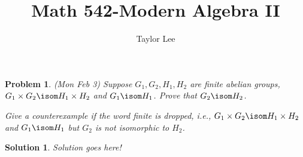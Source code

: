 \documentclass[12pt]{article}
\theoremstyle{moo}
\newtheorem*{prob}{Problem}
\newtheorem*{sol}{Solution}
\begin{document}
\fontseries {\seriesdefault}
\fontshape {\shapedefault}
\selectfont

\title{ Math 542-Modern Algebra II}
\date{\usdate {}}         
\author{Taylor Lee}                          
\maketitle                      



\begin{prob}
(Mon Feb 3) Suppose $G_1,G_2,H_1,H_2$ are finite abelian groups,
$G_1\times G_2\isom H_1\times H_2$ and $G_1\isom H_1$.
Prove that $G_2\isom H_2$.
\par Give a counterexample if the word finite is dropped, i.e.,
$G_1\times G_2\isom H_1\times H_2$ and $G_1\isom H_1$ but $G_2$
is not isomorphic to $H_2$.   
\end{prob}




\begin{sol}

Solution goes here!

\end{sol}
\end{document}
